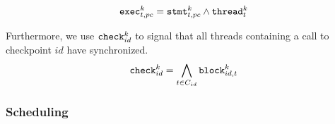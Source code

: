 \[
  \texttt{exec}^k_{t, pc} = \texttt{stmt}^k_{t, pc} \land \texttt{thread}^k_t
\]

\bigskip

Furthermore, we use $\texttt{check}^k_{id}$ to signal that all threads containing a call to checkpoint $id$  have synchronized.%
\[
  \texttt{check}^k_{id} = \bigwedge_{t \in C_{id}} \texttt{block}^k_{id, t}
\]

\subsubsection*{Scheduling}

\newcommand{\CardLt}{\leq^1_n(x_1, \ldots, x_n)}
\newcommand{\CardLtSeq}{\text{LT}^{n, 1}_{\text{SEQ}}}

\newcommand{\ITE}{\texttt{ite}}
\newcommand{\ITEindent}{\;\;\;\;\;\;\;}

